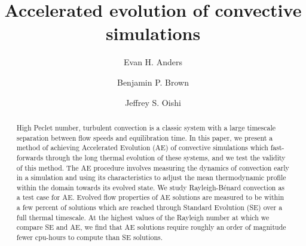 \documentclass[aps, pre, onecolumn, nofootinbib, notitlepage, groupedaddress, amsfonts, amssymb, amsmath, longbibliography]{revtex4-1}
\newcommand{\RB}{Rayleigh-B\'{e}nard }
\begin{document}
\author{Evan H. Anders}
\author{Benjamin P. Brown}
\author{Jeffrey S. Oishi}
\title{Accelerated evolution of convective simulations}

\begin{abstract}
High Peclet number, turbulent convection is a classic system with a large timescale
separation between flow speeds and equilibration time.
In this paper, we present a method of achieving Accelerated Evolution (AE) of convective simulations which
fast-forwards through the long thermal evolution of these systems, and we test the
validity of this method. The AE procedure involves measuring the dynamics of convection
early in a simulation and using its characteristics to adjust the mean thermodynamic
profile within the domain towards its evolved state. We study \RB convection as a test case for AE.  
Evolved flow properties of AE solutions are measured to be within a few percent
of solutions which are reached through Standard Evolution (SE) over a full thermal timescale.
At the highest values of the Rayleigh number at which we compare SE and AE,
we find that AE solutions require roughly an order of magnitude fewer cpu-hours
to compute than SE solutions.
\end{abstract}
\maketitle

\end{document}
